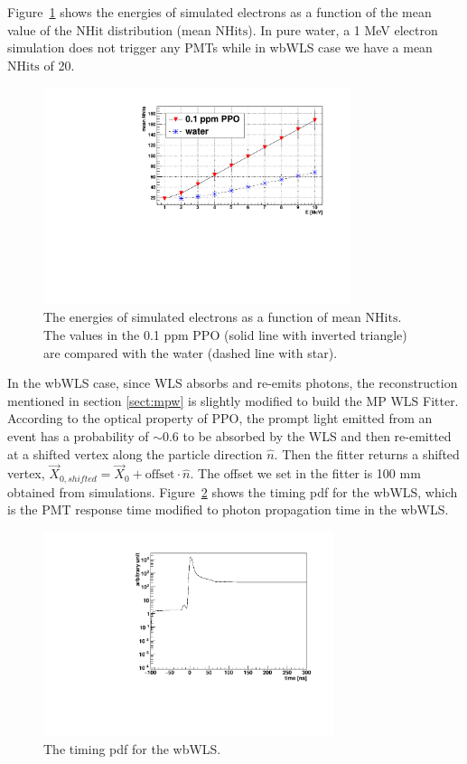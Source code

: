 Figure~\ref{nhit_wls} shows the energies of simulated electrons as a function of the mean value of the $\mathrm{NHit}$ distribution (mean $\mathrm{NHits}$). In pure water, a 1 MeV electron simulation does not trigger any PMTs while in wbWLS case we have a mean $\mathrm{NHits}$ of 20.

\begin{figure}[htbp]
	\centering	
	\includegraphics[width=9cm]{nhits_wls.pdf}
	\caption{ The energies of simulated electrons as a function of mean $\mathrm{NHits}$. The values in the 0.1 ppm PPO (solid line with inverted triangle) are compared with the water (dashed line with star).}
	\label{nhit_wls}
\end{figure}

In the wbWLS case, since WLS absorbs and re-emits photons, the reconstruction mentioned in section \ref{sect:mpw} is slightly modified to build the MP WLS Fitter. According to the optical property of PPO, the prompt light emitted from an event has a probability of $\sim$0.6 to be absorbed by the WLS and then re-emitted at a shifted vertex along the particle direction $\hat{n}$. Then the fitter returns a shifted vertex, $\vec{X}_{0,shifted}=\vec{X}_0+\mathrm{offset}\cdot\hat{n}$. The offset we set in the fitter is 100 mm obtained from simulations. Figure~\ref{WLS_pdf} shows the timing pdf for the wbWLS, which is the PMT response time modified to photon propagation time in the wbWLS.
\begin{figure}[htbp]	
	\centering		
	\begin{minipage}[b]{0.5\textwidth}			
		\includegraphics[height=6cm]{WLSTime_pdf.pdf}			
	\end{minipage}%
	\caption{\label{WLS_pdf} The timing pdf for the wbWLS.}	
\end{figure}

